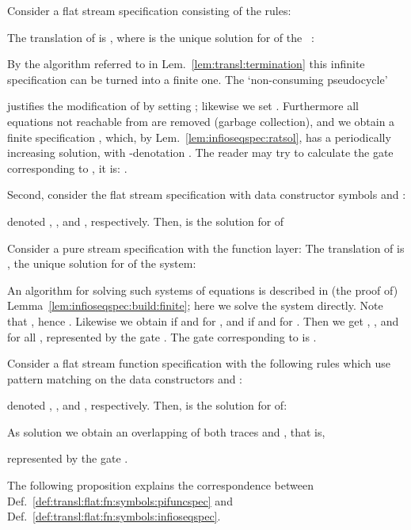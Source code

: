 \begin{example}
Consider a flat stream specification
consisting of the rules:

The translation of  is ,
  where  is the unique solution for 
  of the \infioseqspec~:


  By the algorithm referred to in Lem.~\ref{lem:transl:termination}
  this infinite specification can be turned into a finite one. The `non-consuming pseudocycle'
  
  justifies the modification of  by setting
  ;
  likewise we set .
  Furthermore all equations not reachable from  are removed
  (garbage collection), 
  and we obtain a finite specification , which,
  by Lem.~\ref{lem:infioseqspec:ratsol}, has a periodically increasing
  solution, with \ioterm-denotation
  .
The reader may try to calculate the gate corresponding to ,
  it is:
  .

  Second, consider the flat stream specification
  with data constructor symbols  and :

denoted , ,
  and , respectively.
  Then,  is the solution
  for  of 
\end{example}

\begin{example}\label{ex:pure}
  Consider a pure stream specification with the function layer: 
The translation of  is ,
  the unique solution for  of the system:

An algorithm for solving such systems of equations is described
  in (the proof of) Lemma~\ref{lem:infioseqspec:build:finite}; here we solve the system directly.
  Note that
  ,
  hence .
  Likewise we obtain  if  and  for ,
  and  if  and  for .
  Then we get , ,
  and  for all ,
  represented by the gate .
  The gate corresponding to  is
  .
  \end{example}
\begin{example}\label{ex:flat}
  Consider a flat stream function specification
  with the following rules which use pattern matching on the data constructors  and :
  
denoted , ,
  and , respectively.
  Then,  is the solution for  of:

  As solution we obtain an overlapping of both traces
   and
  ,
  that is,
  
  represented by the gate .
\end{example}


The following proposition explains the correspondence between
Def.~\ref{def:transl:flat:fn:symbols:pifuncspec}
and Def.~\ref{def:transl:flat:fn:symbols:infioseqspec}.



